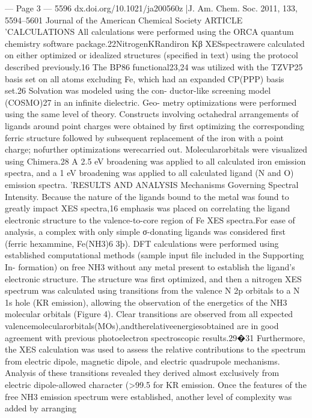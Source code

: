 --- Page 3 ---
5596
dx.doi.org/10.1021/ja200560z |J. Am. Chem. Soc. 2011, 133, 5594–5601
Journal of the American Chemical Society
ARTICLE
’CALCULATIONS
All calculations were performed using the ORCA quantum chemistry
software package.22NitrogenKRandiron Kβ XESspectrawere calculated
on either optimized or idealized structures (speciﬁed in text) using the
protocol described previously.16 The BP86 functional23,24 was utilized
with the TZVP25 basis set on all atoms excluding Fe, which had an
expanded CP(PPP) basis set.26 Solvation was modeled using the con-
ductor-like screening model (COSMO)27 in an inﬁnite dielectric. Geo-
metry optimizations were performed using the same level of theory.
Constructs involving octahedral arrangements of ligands around point
charges
were
obtained
by
ﬁrst
optimizing
the
corresponding
ferric structure followed by subsequent replacement of the iron with a
point charge; nofurther optimizations werecarried out. Molecularorbitals
were visualized using Chimera.28 A 2.5 eV broadening was applied to all
calculated iron emission spectra, and a 1 eV broadening was applied to all
calculated ligand (N and O) emission spectra.
’RESULTS AND ANALYSIS
Mechanisms Governing Spectral Intensity. Because the
nature of the ligands bound to the metal was found to greatly
impact XES spectra,16 emphasis was placed on correlating the
ligand electronic structure to the valence-to-core region of Fe XES
spectra.For ease of analysis, a complex with only simple σ-donating
ligands was considered first (ferric hexammine, Fe(NH3)6
3þ).
DFT calculations were performed using established computational
methods (sample input file included in the Supporting In-
formation) on free NH3 without any metal present to establish
the ligand’s electronic structure. The structure was first optimized,
and then a nitrogen XES spectrum was calculated using transitions
from the valence N 2p orbitals to a N 1s hole (KR emission),
allowing the observation of the energetics of the NH3 molecular
orbitals (Figure 4). Clear transitions are observed from all expected
valencemolecularorbitals(MOs),andtherelativeenergiesobtained
are in good agreement with previous photoelectron spectroscopic
results.29�31 Furthermore, the XES calculation was used to assess
the relative contributions to the spectrum from electric dipole,
magnetic dipole, and electric quadrupole mechanisms. Analysis of
these transitions revealed they derived almost exclusively from
electric dipole-allowed character (>99.5%
for KR emission.
Once the features of the free NH3 emission spectrum were
established, another level of complexity was added by arranging
